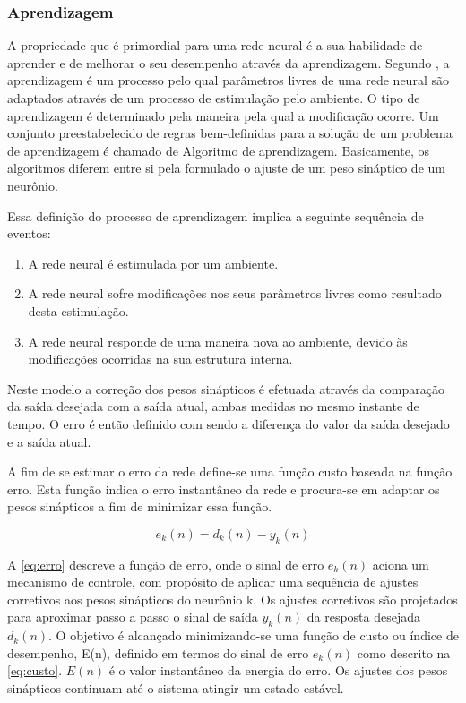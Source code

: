 \subsubsection{Aprendizagem}
A propriedade que é primordial para uma rede neural é a sua habilidade de aprender e de melhorar o seu desempenho através da aprendizagem. Segundo , a aprendizagem é um processo pelo qual parâmetros livres de uma rede neural são adaptados através de um processo de estimulação pelo ambiente. O tipo de aprendizagem é determinado pela maneira pela qual a modificação ocorre. Um conjunto preestabelecido de regras bem-definidas para a solução de um problema de aprendizagem é chamado de Algoritmo de aprendizagem. Basicamente, os algoritmos diferem entre si pela formulado o ajuste de um peso sináptico de um neurônio. 

Essa definição do processo de aprendizagem implica  a seguinte sequência de eventos:
    \begin{enumerate}
        \item A rede neural é estimulada por um ambiente.
        \item A rede neural sofre modificações nos seus parâmetros livres como resultado desta estimulação.
        \item A rede neural responde de uma maneira nova ao ambiente, devido às modificações ocorridas na sua estrutura interna.
    \end{enumerate}
  

Neste modelo a correção dos pesos sinápticos é efetuada através da comparação da saída desejada com a saída atual, ambas medidas no mesmo instante de tempo. O erro é então definido com sendo a diferença do valor da saída desejado e a saída atual.

A fim de se estimar o erro da rede define-se uma função custo baseada na função erro. Esta função indica o erro instantâneo da rede e procura-se em adaptar os pesos
sinápticos a fim de minimizar essa função. 

\begin{equation} \label{eq:erro}
    e_{k}(n) = d_{k}(n) - y_{k}(n)    
\end{equation}

A \autoref{eq:erro} descreve a função de erro, onde o sinal de erro $e_{k}(n)$ aciona um mecanismo de controle, com propósito de aplicar uma sequência de ajustes corretivos aos pesos sinápticos do neurônio k. Os ajustes corretivos são projetados para aproximar passo a passo o sinal de saída $y_{k}(n)$ da resposta desejada $d_{k}(n)$. O objetivo é alcançado minimizando-se uma função de custo ou índice de desempenho, E(n), definido em termos do sinal de erro $e_{k}(n)$ como descrito na \autoref{eq:custo}. $E(n)$ é o valor instantâneo da energia do erro. Os ajustes dos pesos sinápticos continuam até o sistema atingir um estado estável.

